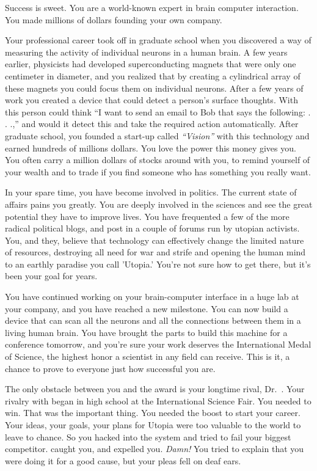 \documentclass[char]{guildcamp1}
\begin{document}
\name{\cRival{}}


Success is sweet.  You are a world-known expert in brain computer interaction.  You made millions of dollars founding your own company.  

Your professional career took off in graduate school when you discovered a way of measuring the activity of individual neurons in a human brain.  A few years earlier, physicists had developed superconducting magnets that were only one centimeter in diameter, and you realized that by creating a cylindrical array of these magnets you could focus them on individual neurons.  After a few years of work you created a device that could detect a person's surface thoughts. With this person could think ``I want to send an email to Bob that says the following: . . .,'' and would it detect this and take the required action automatically.  After graduate school, you founded a start-up called {\em ``Vision''} with this technology and earned hundreds of  millions dollars.  You love the power this money gives you.  You often carry a million dollars of stocks around with you, to remind yourself of your wealth and to trade if you find someone who has something you really want.

In your spare time, you have become involved in politics.  The current state of affairs pains you greatly.  You are deeply involved in the sciences and see the great potential they have to improve lives. You have frequented a few of the more radical political blogs, and post in a couple of forums run by utopian activists. You, and they, believe that technology can effectively change the limited nature of resources, destroying all need for war and strife and opening the human mind to an earthly paradise you call 'Utopia.' You're not sure how to get there, but it's been your goal for years.

You have continued working on your brain-computer interface in a huge lab at your company, and you have reached a new milestone.  You can now build a device that can scan all the neurons and all the connections between them in a living human brain.  You have brought the parts to build this machine for a conference tomorrow, and you're sure your work deserves the International Medal of Science, the highest honor a scientist in any field can receive.  This is it, a chance to prove to everyone just how successful you are.

The only obstacle between you and the award is your longtime rival, Dr.~\cScientist{\intro}.  Your rivalry with \cScientist{} began in high school at the International Science Fair.  %
You needed to win. That was the important thing. You needed the boost to start your career. Your ideas, your goals, your plans for Utopia were too valuable to the world to leave to chance. So you hacked into the system and tried to fail your biggest competitor. \cScientist{} caught you, and expelled you. \emph{Damn!} You tried to explain that you were doing it for a good cause, but your pleas fell on deaf ears.
\end{document}
